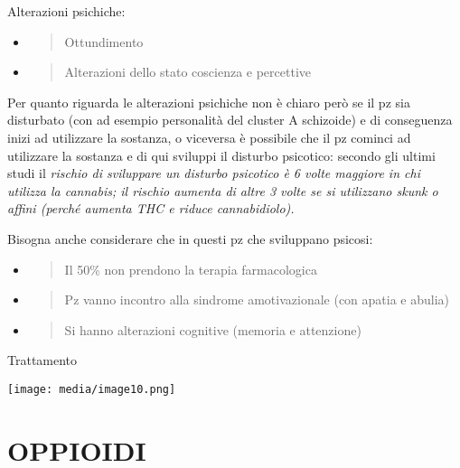 \documentclass[]{article}
\begin{document}
Alterazioni psichiche:

\begin{itemize}
\item
  \begin{quote}
  Ottundimento
  \end{quote}
\item
  \begin{quote}
  Alterazioni dello stato coscienza e percettive
  \end{quote}
\end{itemize}

Per quanto riguarda le alterazioni psichiche non è chiaro però se il pz
sia disturbato (con ad esempio personalità del cluster A schizoide) e di
conseguenza inizi ad utilizzare la sostanza, o viceversa è possibile che
il pz cominci ad utilizzare la sostanza e di qui sviluppi il disturbo
psicotico: secondo gli ultimi studi il \emph{rischio di sviluppare un
disturbo psicotico è 6 volte maggiore in chi utilizza la cannabis; il
rischio aumenta di altre 3 volte se si utilizzano skunk o affini (perché
aumenta THC e riduce cannabidiolo).}

Bisogna anche considerare che in questi pz che sviluppano psicosi:

\begin{itemize}
\item
  \begin{quote}
  Il 50\% non prendono la terapia farmacologica
  \end{quote}
\item
  \begin{quote}
  Pz vanno incontro alla sindrome amotivazionale (con apatia e abulia)
  \end{quote}
\item
  \begin{quote}
  Si hanno alterazioni cognitive (memoria e attenzione)
  \end{quote}
\end{itemize}

Trattamento

\texttt{[image: media/image10.png]}

\section{}\label{section}

\section{OPPIOIDI}\label{oppioidi}
\end{document}
